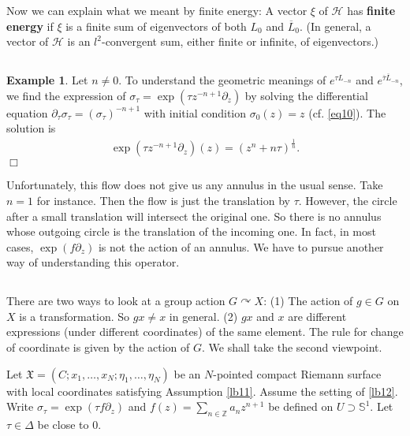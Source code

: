 \documentclass[12pt,a4paper,notitlepage]{article}
\theoremstyle{definition}
\newtheorem{eg}[df]{Example}
\theoremstyle{plain}
\newcommand{\fk}{\mathfrak}
\newcommand{\mc}{\mathcal}
\newcommand{\ovl}{\overline}
\newcommand{\Zbb}{\mathbb Z}
\newcommand{\Sbb}{{\mathbb S}}
\numberwithin{equation}{section}
\begin{document}


Now we can explain what we meant by finite energy: A vector $\xi$ of $\mc H$ has \textbf{finite energy} if $\xi$ is a finite sum of eigenvectors of both $L_0$ and $\ovl L_0$. (In general, a vector of $\mc H$ is an $l^2$-convergent sum, either finite or infinite, of eigenvectors.)




\subsection{}

\begin{eg}\label{lb20}
Let $n\neq 0$. To understand the geometric meanings of $e^{\tau L_{-n}}$ and $e^{\ovl\tau\ovl L_{-n}}$, we find the expression of $\sigma_\tau=\exp(\tau z^{-n+1}\partial_z)$ by solving the differential equation $\partial_\tau\sigma_\tau=(\sigma_\tau)^{-n+1}$ with initial condition $\sigma_0(z)=z$ (cf. \eqref{eq10}). The solution is
\begin{align}
\exp (\tau z^{-n+1}\partial_z)(z)=(z^n+n\tau)^{\frac 1n}.\label{eq17}
\end{align}
\hfill $\Box$
\end{eg}

Unfortunately, this flow does not give us any annulus in the usual sense. Take $n=1$ for instance. Then the flow is just the translation by $\tau$. However, the circle after a small translation will intersect the original one. So there is no annulus whose outgoing circle is the translation of the incoming one. In fact, in most cases,   $\exp(f\partial_z)$ is not the action of an annulus. We have to pursue another way of understanding this operator.



\subsection{}\label{lb13}


There are two ways to look at a group action $G\curvearrowright X$: (1) The action of $g\in G$ on $X$ is a transformation. So $gx\neq x$ in general. (2) $gx$ and $x$ are different expressions (under different coordinates) of the same element. The rule for change of coordinate is given by the action of $G$. We shall take the second viewpoint.



Let $\fk X=(C;x_1,\dots,x_N;\eta_1,\dots,\eta_N)$ be an $N$-pointed compact Riemann surface with local coordinates satisfying Assumption \ref{lb11}. Assume the setting of \ref{lb12}. Write $\sigma_\tau=\exp(\tau f\partial_z)$ and $f(z)=\sum_{n\in\Zbb}a_nz^{n+1}$ be defined on $U\supset\Sbb^1$. Let $\tau\in\Delta$ be close to $0$. 
\end{document}
